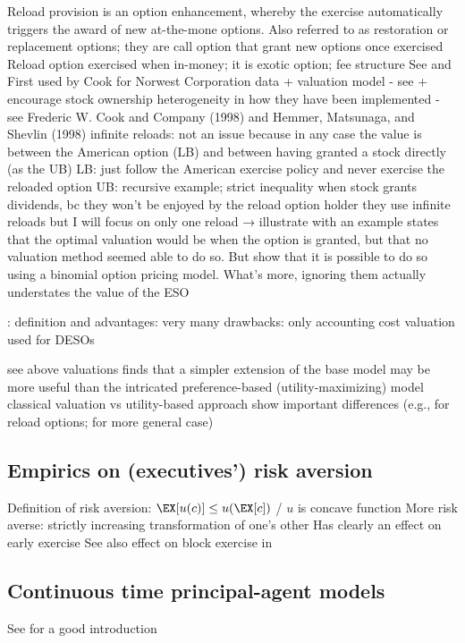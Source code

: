     Reload provision is an option enhancement, whereby the exercise automatically triggers the award of new at-the-mone options. 
    Also referred to as restoration or replacement options; they are call option that grant new options once exercised
    Reload option exercised when in-money; it is exotic option; fee structure \cite{zhang2010knightian}
    See \cite{hemmer1998optimal} and \cite{hemmer2000reload}
    First used by Cook for Norwest Corporation 
    data + valuation model - see \cite{dybvig2003employee}
    + encourage stock ownership 
    heterogeneity in how they have been implemented - see Frederic W. Cook and Company (1998) and Hemmer, Matsunaga, and Shevlin (1998) 
        infinite reloads: not an issue because in any case the value is between the American option (LB) and between having granted a stock directly (as the UB) \cite{dybvig2003employee}
            LB: just follow the American exercise policy and never exercise the reloaded option
            UB: recursive example; strict inequality when stock grants dividends, bc they won't be enjoyed by the reload option holder 
            they use infinite reloads but I will focus on only one reload 
    → illustrate with an example
    \cite{fasb123} states that the optimal valuation would be when the option is granted, but that no valuation method seemed able to do so.
    But \cite{saly1999valuing} show that it is possible to do so using a binomial option pricing model. What's more, ignoring them actually understates the value of the ESO \cite{saly1998ignoring}

    \cite{huang2013dynamic}:
        definition and 
        advantages: very many
        drawbacks: only accounting cost
        valuation used for DESOs

    see above valuations 
    \cite{carpenter1998exercise} finds that a simpler extension of the base model may be more useful than the intricated preference-based (utility-maximizing) model
    classical valuation vs utility-based approach show important differences (e.g., \cite{lau2005valuation} for reload options; \cite{ingersoll2006subjective} for more general case)


 



\subsection{Empirics on (executives') risk aversion} %
    Definition of risk aversion: $\EX[u(c)] \le u(\EX[c])$ / $u$ is concave function
    More risk averse: strictly increasing transformation of one's other
    Has clearly an effect on early exercise \cite{izhakian2017risk} \cite{murphy2019employees}
    See also effect on block exercise in \cite{grasselli2009risk}





\subsection{Continuous time principal-agent models} %
    See \cite{cvitanic2013dynamics} for a good introduction




